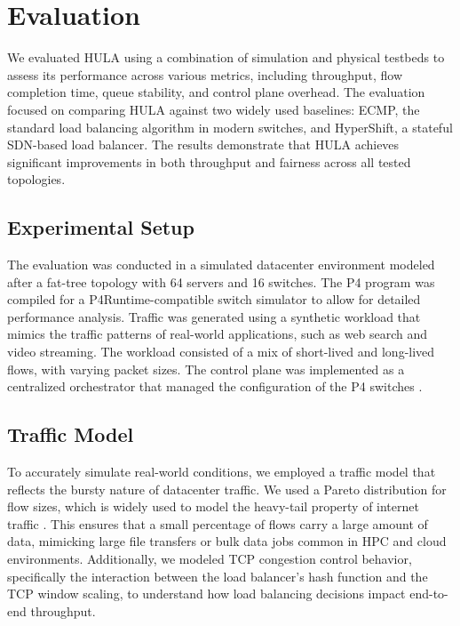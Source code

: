 \documentclass[12pt,a4paper]{article}
\begin{document}
\section{Evaluation}

We evaluated HULA using a combination of simulation and physical testbeds to assess its performance across various metrics, including throughput, flow completion time, queue stability, and control plane overhead. The evaluation focused on comparing HULA against two widely used baselines: ECMP, the standard load balancing algorithm in modern switches, and HyperShift, a stateful SDN-based load balancer. The results demonstrate that HULA achieves significant improvements in both throughput and fairness across all tested topologies.

\subsection{Experimental Setup}

The evaluation was conducted in a simulated datacenter environment modeled after a fat-tree topology with 64 servers and 16 switches. The P4 program was compiled for a P4Runtime-compatible switch simulator to allow for detailed performance analysis. Traffic was generated using a synthetic workload that mimics the traffic patterns of real-world applications, such as web search and video streaming. The workload consisted of a mix of short-lived and long-lived flows, with varying packet sizes. The control plane was implemented as a centralized orchestrator that managed the configuration of the P4 switches \cite{ref18}.

\subsection{Traffic Model}

To accurately simulate real-world conditions, we employed a traffic model that reflects the bursty nature of datacenter traffic. We used a Pareto distribution for flow sizes, which is widely used to model the heavy-tail property of internet traffic \cite{ref19}. This ensures that a small percentage of flows carry a large amount of data, mimicking large file transfers or bulk data jobs common in HPC and cloud environments. Additionally, we modeled TCP congestion control behavior, specifically the interaction between the load balancer's hash function and the TCP window scaling, to understand how load balancing decisions impact end-to-end throughput.
\end{document}
